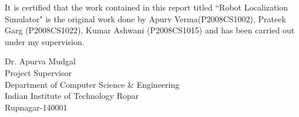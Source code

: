 


\begin{certificate}      %

It is certified that the work contained in this report titled ``Robot Localization Simulator" is the original work done by 
Apurv Verma(P2008CS1002), Prateek Garg (P2008CS1022), Kumar Ashwani (P2008CS1015) and has been carried out under my supervision. \\

\vspace*{20mm}

\begin{flushright}
Dr. Apurva Mudgal \\ Project Supervisor \\ Department of Computer Science \& Engineering \\ Indian Institute of Technology Ropar \\ Rupnagar-140001
\end{flushright}


\end{certificate}



